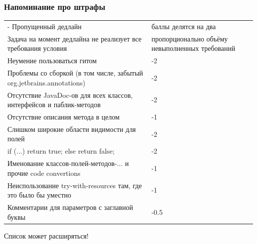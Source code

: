 \documentclass[xetex,mathserif,serif]{beamer}
\begin{document}
	\begin{frame}
		\frametitle{Напоминание про штрафы}
		\begin{scriptsize}
			\begin{tabu} {| X[1 l p] | X[0.3 l p] |}
				\tabucline-
				\everyrow{\tabucline-}
				Пропущенный дедлайн                                                                   & баллы делятся на два \\
				Задача на момент дедлайна не реализует все требования условия                         & пропорционально объёму невыполненных требований \\
				Неумение пользоваться гитом                                                           & -2 \\
				Проблемы со сборкой (в том числе, забытый org.jetbrains.annotations)                  & -2 \\
				Отсутствие JavaDoc-ов для всех классов, интерфейсов и паблик-методов                  & -2 \\
				Отсутствие описания метода в целом                                                    & -1 \\
				Слишком широкие области видимости для полей                                           & -2 \\
				if (...) return true; else return false;                                              & -2 \\
				Именование классов-полей-методов-... и прочие code convertions                        & -1 \\
				Неиспользование try-with-resources там, где это было бы уместно                       & -1 \\
				Комментарии для параметров с заглавной буквы                                          & -0.5 \\
			\end{tabu}
		\end{scriptsize}
		\begin{center}
			\scriptsize{Список может расширяться!}
		\end{center}
	\end{frame}
\end{document}
